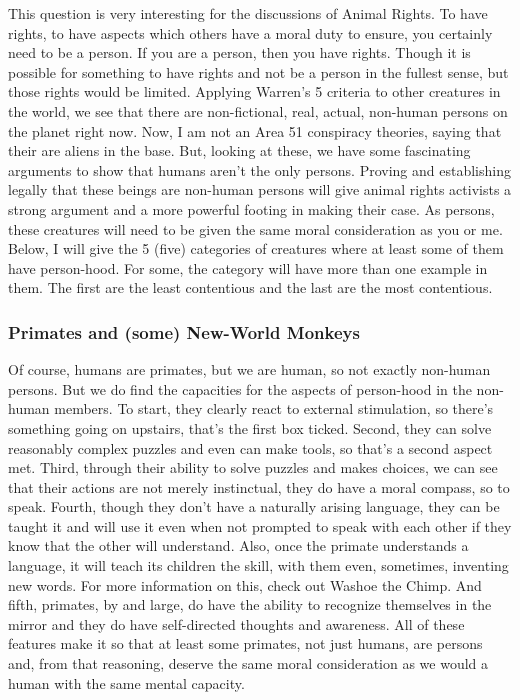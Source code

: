 This question is very interesting for the discussions of Animal Rights. To have rights, to have aspects which others have a moral duty to ensure, you certainly need to be a person. If you are a person, then you have rights. Though it is possible for something to have rights and not be a person in the fullest sense, but those rights would be limited. Applying Warren's 5 criteria to other creatures in the world, we see that there are non-fictional, real, actual, non-human persons on the planet right now. Now, I am not an Area 51 conspiracy theories, saying that their are aliens in the base. But, looking at these, we have some fascinating arguments to show that humans aren't the only persons. Proving and establishing legally that these beings are non-human persons will give animal rights activists a strong argument and a more powerful footing in making their case. As persons, these creatures will need to be given the same moral consideration as you or me. 
Below, I will give the 5 (five) categories of creatures where at least some of them have person-hood. For some, the category will have more than one example in them. The first are the least contentious and the last are the most contentious. 
\subsubsection{Primates and (some) New-World Monkeys}

Of course, humans are primates, but we are human, so not exactly non-human persons. But we do find the capacities for the aspects of person-hood in the non-human members. To start, they clearly react to external stimulation, so there's something going on upstairs, that's the first box ticked. Second, they can solve reasonably complex puzzles and even can make tools, so that's a second aspect met. Third, through their ability to solve puzzles and makes choices, we can see that their actions are not merely instinctual, they do have a moral compass, so to speak. Fourth, though they don't have a naturally arising language, they can be taught it and will use it even when not prompted to speak with each other if they know that the other will understand. Also, once the primate understands a language, it will teach its children the skill, with them even, sometimes, inventing new words. For more information on this, check out Washoe the Chimp. And fifth, primates, by and large, do have the ability to recognize themselves in the mirror and they do have self-directed thoughts and awareness. All of these features make it so that at least some primates, not just humans, are persons and, from that reasoning, deserve the same moral consideration as we would a human with the same mental capacity. 

